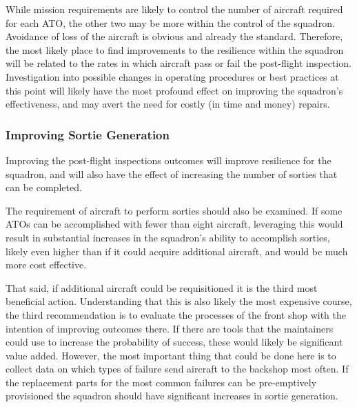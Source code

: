 \documentclass[12pt]{amsart}
\begin{document}
While mission requirements are likely to control the number of aircraft required 
for each ATO, the other two may be more within the control of the squadron.
Avoidance of loss of the aircraft is obvious and already the standard.
Therefore, the most likely place to find improvements to the resilience within 
the squadron will be related to the rates in which aircraft pass or fail the post-flight inspection.
Investigation into possible changes in operating procedures or best practices at this 
point will likely have the most profound effect on improving the squadron's effectiveness,
and may avert the need for costly (in time and money) repairs.

\subsubsection{Improving Sortie Generation}
Improving the post-flight inspections outcomes will improve resilience for the squadron,
and will also have the effect of increasing the number of sorties that can be completed.

The requirement of aircraft to perform sorties should also be examined.
If some ATOs can be accomplished with fewer than eight aircraft, leveraging this
would result in substantial increases in the squadron's ability to accomplish sorties,
likely even higher than if it could acquire additional aircraft,
and would be much more cost effective.

That said, if additional aircraft could be requisitioned it is the third most beneficial action.
Understanding that this is also likely the most expensive course, the third recommendation is to 
evaluate the processes of the front shop with the intention of improving outcomes there.
If there are tools that the maintainers could use to increase the probability of success,
these would likely be significant value added.
However, the most important thing that could be done here is to collect data on which types of
failure send aircraft to the backshop most often.
If the replacement parts for the most common failures can be pre-emptively provisioned
the squadron should have significant increases in sortie generation.
\end{document}
